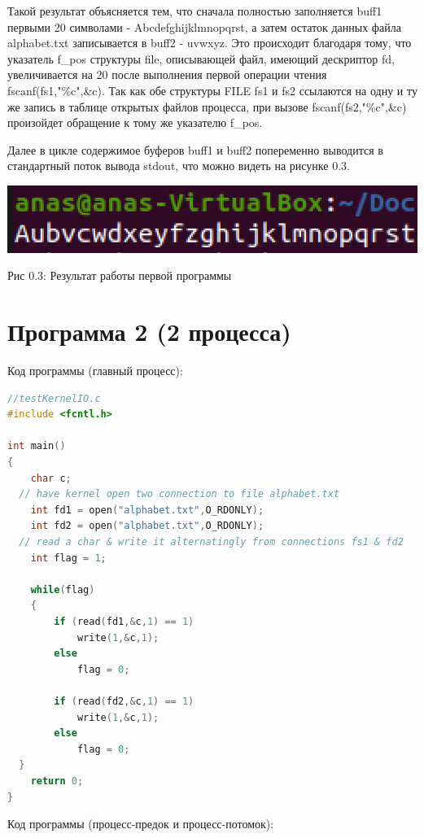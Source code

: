 \documentclass[12pt]{report}
\begin{document}
Такой результат объясняется тем, что сначала полностью заполняется buff1 первыми 20 символами - Abcdefghijklmnopqrst, а затем остаток данных файла alphabet.txt записывается в buff2 - uvwxyz. Это происходит благодаря тому, что указатель f\_pos структуры file, описывающей файл, имеющий дескриптор fd, увеличивается на 20 после выполнения первой операции чтения fscanf(fs1,"\%c",\&c). Так как обе структуры FILE fs1 и fs2 ссылаются на одну и ту же запись в таблице открытых файлов процесса, при вызове fscanf(fs2,"\%c",\&c) произойдет обращение к тому же указателю f\_pos.

Далее в цикле содержимое буферов buff1 и buff2 попеременно выводится в стандартный поток вывода stdout, что можно видеть на рисунке 0.3.

\begin{center}
		\includegraphics[scale=0.6]{pics/Res1.png}
		
			Рис 0.3: Результат работы первой программы
\end{center}

\section{Программа 2 (2 процесса)}

Код программы (главный процесс):

\begin{lstlisting}[language=C]
//testKernelIO.c
#include <fcntl.h>

int main()
{
    char c;
  // have kernel open two connection to file alphabet.txt
    int fd1 = open("alphabet.txt",O_RDONLY);
    int fd2 = open("alphabet.txt",O_RDONLY);
  // read a char & write it alternatingly from connections fs1 & fd2
    int flag = 1;
    
    while(flag)
    {
        if (read(fd1,&c,1) == 1)
            write(1,&c,1);
        else
            flag = 0;
    
        if (read(fd2,&c,1) == 1)
            write(1,&c,1);
        else
            flag = 0;
  }
    return 0;
}
\end{lstlisting}

Код программы (процесс-предок и процесс-потомок):
\end{document}
